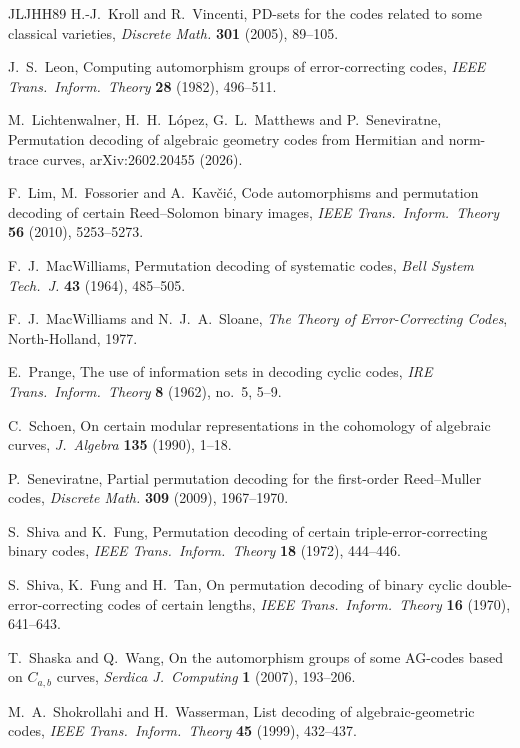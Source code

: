 \documentclass[12pt,letterpaper]{article}
\theoremstyle{definition}
\theoremstyle{remark}
\numberwithin{equation}{section}
\begin{document}
\begin{thebibliography}{JLJHH89}
 H.-J.~Kroll and R.~Vincenti, PD-sets for the codes
related to some classical varieties, \emph{Discrete Math.} \textbf{301}
(2005), 89--105.

 J.~S.~Leon, Computing automorphism groups of
error-correcting codes, \emph{IEEE Trans.\ Inform.\ Theory} \textbf{28}
(1982), 496--511.

 M.~Lichtenwalner, H.~H.~L\'opez,
G.~L.~Matthews and P.~Seneviratne, Permutation decoding of algebraic
geometry codes from Hermitian and norm-trace curves, arXiv:2602.20455
(2026).

 F.~Lim, M.~Fossorier and A.~Kav\v{c}i\'c, Code
automorphisms and permutation decoding of certain Reed--Solomon binary
images, \emph{IEEE Trans.\ Inform.\ Theory} \textbf{56} (2010),
5253--5273.

 F.~J.~MacWilliams, Permutation decoding of
systematic codes, \emph{Bell System Tech.\ J.} \textbf{43} (1964),
485--505.

 F.~J.~MacWilliams and N.~J.~A.~Sloane, \emph{The
Theory of Error-Correcting Codes}, North-Holland, 1977.

 E.~Prange, The use of information sets in decoding
cyclic codes, \emph{IRE Trans.\ Inform.\ Theory} \textbf{8} (1962),
no.~5, 5--9.

 C.~Schoen, On certain modular representations in the
cohomology of algebraic curves, \emph{J.\ Algebra} \textbf{135} (1990),
1--18.

 P.~Seneviratne, Partial permutation decoding for
the first-order Reed--Muller codes, \emph{Discrete Math.} \textbf{309}
(2009), 1967--1970.

 S.~Shiva and K.~Fung, Permutation decoding of
certain triple-error-correcting binary codes, \emph{IEEE Trans.\ Inform.\
Theory} \textbf{18} (1972), 444--446.

 S.~Shiva, K.~Fung and H.~Tan, On permutation
decoding of binary cyclic double-error-correcting codes of certain
lengths, \emph{IEEE Trans.\ Inform.\ Theory} \textbf{16} (1970),
641--643.

 T.~Shaska and Q.~Wang, On the automorphism groups
of some AG-codes based on $C_{a,b}$ curves, \emph{Serdica J.\ Computing}
\textbf{1} (2007), 193--206.

 M.~A.~Shokrollahi and H.~Wasserman, List decoding
of algebraic-geometric codes, \emph{IEEE Trans.\ Inform.\ Theory}
\textbf{45} (1999), 432--437.


\end{thebibliography}
\end{document}
